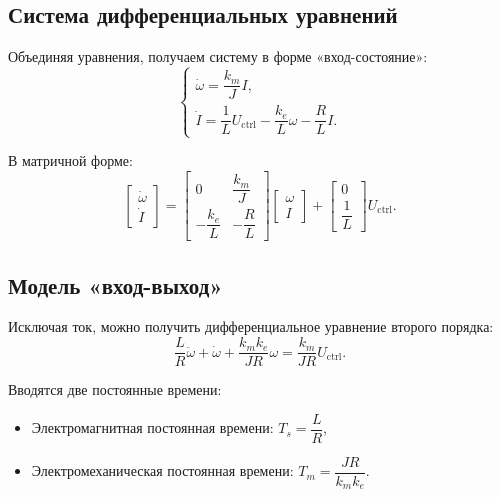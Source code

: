 \documentclass[a4paper, 12pt]{article}
\begin{document}
\subsection{Система дифференциальных уравнений}

Объединяя уравнения, получаем систему в форме «вход-состояние»:
\begin{equation}
    \begin{cases}
        \dot{\omega} = \dfrac{k_m}{J} I, \\[10pt]
        \dot{I} = \dfrac{1}{L} U_{\text{ctrl}} - \dfrac{k_e}{L} \omega - \dfrac{R}{L} I.
    \end{cases}
\end{equation}

В матричной форме:
\begin{equation}
    \begin{bmatrix} \dot{\omega} \\ \dot{I} \end{bmatrix} =
    \begin{bmatrix} 0 & \dfrac{k_m}{J} \\ -\dfrac{k_e}{L} & -\dfrac{R}{L} \end{bmatrix}
    \begin{bmatrix} \omega \\ I \end{bmatrix} +
    \begin{bmatrix} 0 \\ \dfrac{1}{L} \end{bmatrix} U_{\text{ctrl}}.
\end{equation}

\subsection{Модель «вход-выход»}

Исключая ток, можно получить дифференциальное уравнение второго порядка:
\begin{equation}
    \frac{L}{R} \ddot{\omega} + \dot{\omega} + \frac{k_m k_e}{JR} \omega = \frac{k_m}{JR} U_{\text{ctrl}}.
\end{equation}

Вводятся две постоянные времени:
\begin{itemize}
    \item Электромагнитная постоянная времени: $T_s = \dfrac{L}{R}$,
    \item Электромеханическая постоянная времени: $T_m = \dfrac{JR}{k_m k_e}$.
\end{itemize}
\end{document}
